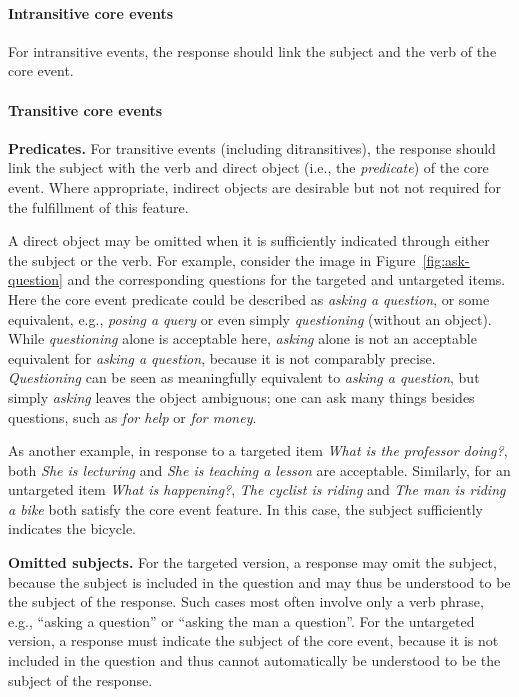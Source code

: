 \documentclass[12pt,notitlepage]{article}
\begin{document}
\paragraph{Intransitive core events} For intransitive events, the response should link the subject and the verb of the core event.

\paragraph{Transitive core events} \textbf{Predicates.} For transitive events (including ditransitives), the response should link the subject with the verb and direct object (i.e., the \textit{predicate}) of the core event. Where appropriate, indirect objects are desirable but not not required for the fulfillment of this feature. 

A direct object may be omitted when it is sufficiently indicated through either the subject or the verb. For example, consider the image in Figure~\ref{fig:ask-question} and the corresponding questions for the targeted and untargeted items. Here the core event predicate could be described as \textit{asking a question}, or some equivalent, e.g., \textit{posing a query} or even simply \textit{questioning} (without an object). While \textit{questioning} alone is acceptable here,
 \textit{asking} alone is not an acceptable equivalent for \textit{asking a question}, because it is not comparably precise. \textit{Questioning} can be seen as meaningfully equivalent to \textit{asking a question}, but simply \textit{asking} leaves the object ambiguous; one can ask many things besides questions, such as \textit{for help} or \textit{for money}.

As another example, in response to a targeted item \textit{What is the professor doing?}, both \textit{She is lecturing} and \textit{She is teaching a lesson} are acceptable. Similarly, for an untargeted item \textit{What is happening?}, \textit{The cyclist is riding} and \textit{The man is riding a bike} both satisfy the core event feature. In this case, the subject sufficiently indicates the bicycle.


\textbf{Omitted subjects.} For the targeted version, a response may omit the subject, because the subject is included in the question and may thus be understood to be the subject of the response. Such cases most often involve only a verb phrase, e.g., ``asking a question'' or ``asking the man a question''. For the untargeted version, a response must indicate the subject of the core event, because it is not included in the question and thus cannot automatically be understood to be the subject of the response.
\end{document}
